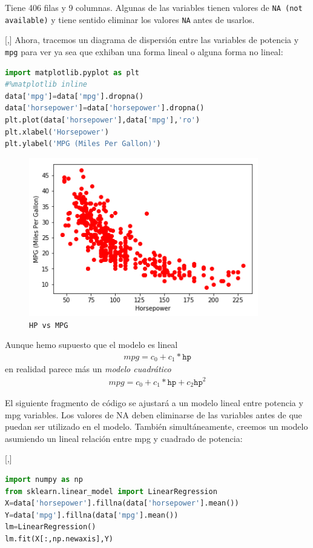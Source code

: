 Tiene 406 filas y 9 columnas. Algunas de las variables tienen valores de \texttt{NA (not available)} y tiene sentido eliminar los valores \texttt{NA} antes de usarlos.

[,]{}
Ahora, tracemos un diagrama de dispersión entre las variables de potencia y \texttt{mpg} para ver
ya sea que exhiban una forma lineal o alguna forma no lineal:
\begin{lstlisting}[language=Python]
import matplotlib.pyplot as plt
#%matplotlib inline
data['mpg']=data['mpg'].dropna()
data['horsepower']=data['horsepower'].dropna()
plt.plot(data['horsepower'],data['mpg'],'ro')
plt.xlabel('Horsepower')
plt.ylabel('MPG (Miles Per Gallon)')
\end{lstlisting}


\begin{figure}
 \centering
 \includegraphics[width=10cm,keepaspectratio=true]{./images/hpVsMpg.png}
 \caption{\texttt{HP vs MPG}}
 \label{fig:hp}
\end{figure}


Aunque hemo supuesto que el modelo es lineal
\begin{align}
 mpg = c_{0} + c_{1}*\texttt{hp}
\end{align}
en realidad parece más un \emph{modelo cuadrático}
\begin{align}
 mpg = c_{0} + c_{1}*\texttt{hp} + c_{2}\texttt{hp}^{2}
\end{align}


El siguiente fragmento de código se ajustará a un modelo lineal entre potencia y mpg
variables. Los valores de NA deben eliminarse de las variables antes de que puedan
ser utilizado en el modelo. También simultáneamente, creemos un modelo asumiendo un lineal
relación entre mpg y cuadrado de potencia:

[,]{}
\begin{lstlisting}[language=Python]
import numpy as np
from sklearn.linear_model import LinearRegression
X=data['horsepower'].fillna(data['horsepower'].mean())
Y=data['mpg'].fillna(data['mpg'].mean())
lm=LinearRegression()
lm.fit(X[:,np.newaxis],Y)
\end{lstlisting}


